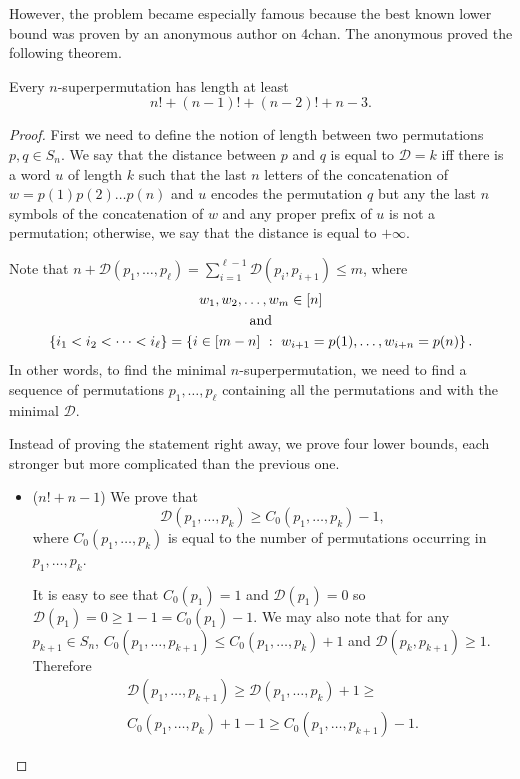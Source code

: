 However, the problem became especially famous because the best known lower bound
was proven by an anonymous author on 4chan. The anonymous proved the following
theorem.
\begin{theorem}
  Every $n$-superpermutation has length at least
  \[
    n! + (n - 1)! + (n - 2)! + n - 3.
  \]
\end{theorem}
\begin{proof}
  First we need to define the notion of length between two permutations
  $p, q \in S_n$. We say that the distance between $p$ and $q$ is equal to
  $\mathcal{D} = k$
  iff there is a word $u$ of length $k$ such that the last $n$ letters of the
  concatenation of  $w = p(1) p(2) \dots p(n)$ and $u$ encodes the permutation
  $q$ but any the last $n$ symbols of the concatenation of $w$ and any proper
  prefix of $u$ is not a permutation; otherwise, we say that the distance is
  equal to $+\infty$.

  Note that $n + \mathcal{D}(p_1, \dots, p_\ell) =
  \sum_{i = 1}^{\ell - 1} \mathcal{D}(p_i, p_{i + 1}) \le m$, where
  \begin{gather*}
    w_1, w_2, \dots, w_m \in \range{n} \\
    \text{and} \\
    \set{i_1 < i_2 < \dots < i_\ell} =
    \set[{
      w_{i + 1} = p(1), \dots, w_{i + n} = p(n)
    }]{
      i \in \range{m - n}
    }.
  \end{gather*}
  In other words, to find the minimal $n$-superpermutation, we need to find
  a sequence of permutations $p_1, \dots, p_\ell$ containing all the permutations
  and with the minimal $\mathcal{D}$.

  Instead of proving the statement right away, we prove four lower bounds, each
  stronger but more complicated than the previous one.

  \begin{itemize}
    \item ($n! + n - 1$) We prove that
      \begin{equation}
        \label{equation:inequality-1}
        \mathcal{D}(p_1, \dots, p_k) \ge
        C_0(p_1, \dots, p_k) - 1,
      \end{equation}
      where $C_0(p_1, \dots, p_k)$ is equal to
      the number of permutations occurring in $p_1, \dots, p_k$.

      It is easy to see that $C_0(p_1) = 1$ and $\mathcal{D}(p_1) = 0$ so
      $\mathcal{D}(p_1) = 0 \ge 1 - 1 = C_0(p_1) - 1$. We may also
      note that for any $p_{k + 1} \in S_n$,
      $C_0(p_1, \dots, p_{k + 1}) \le C_0(p_1, \dots, p_k) + 1$ and
      $\mathcal{D}(p_k, p_{k + 1}) \ge 1$. Therefore
      \begin{multline*}
        \mathcal{D}(p_1, \dots, p_{k + 1}) \ge
        \mathcal{D}(p_1, \dots, p_k) + 1 \ge \\
        C_0(p_1, \dots, p_k) + 1 - 1 \ge
        C_0(p_1, \dots, p_{k + 1}) - 1.
      \end{multline*}


\end{itemize}
\end{proof}
